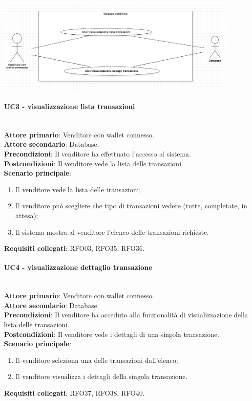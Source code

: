 \documentclass[a4paper, 12pt]{article}
\begin{document}
\includegraphics[width=0.9\textwidth]{UC_WAV3}

\paragraph{UC3 - visualizzazione lista transazioni}\\
\textbf{Attore primario}: Venditore con wallet connesso. \\
\textbf{Attore secondario}: Database. \\
\textbf{Precondizioni}: Il venditore ha effettuato l'accesso al sistema.\\
\textbf{Postcondizioni}:  Il venditore vede la lista delle transazioni.\\
\textbf{Scenario principale}:
\begin{enumerate}
\item Il venditore vede la lista delle transazioni;
\item Il venditore può scegliere che tipo di transazioni vedere (tutte, completate, in attesa);
\item Il sistema mostra al venditore l'elenco delle transazioni richieste.
\end{enumerate}
\textbf{Requisiti collegati}: RFO03, RFO35, RFO36.

\paragraph{UC4 - visualizzazione dettaglio transazione}\\
\textbf{Attore primario}: Venditore con wallet connesso.\\
\textbf{Attore secondario}: Database\\
\textbf{Precondizioni}: Il venditore ha acceduto alla funzionalità di visualizzazione della lista delle transazioni.\\
\textbf{Postcondizioni}: Il venditore vede i dettagli di una singola transazione.\\
\textbf{Scenario principale}:
\begin{enumerate}
\item Il venditore seleziona una delle transazioni dall'elenco;
\item Il venditore visualizza i dettagli della singola transazione.
\end{enumerate}
\textbf{Requisiti collegati}: RFO37, RFO38, RFO40.
\end{document}
